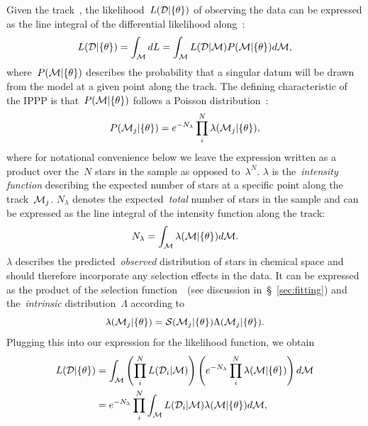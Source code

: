 \documentclass[ms.tex]{subfiles}
\begin{document}
\par
Given the track~, the likelihood~$L(\mathcal{D} | \{\theta\})$ of
observing the data can be expressed as the line integral of the differential
likelihood along~:
\begin{equation}
L(\mathcal{D} | \{\theta\}) = \int_{\mathcal{M}} dL =
\int_{\mathcal{M}} L(\mathcal{D} | \mathcal{M}) P(\mathcal{M} | \{\theta\})
d\mathcal{M},
\end{equation}
where~$P(\mathcal{M} | \{\theta\})$ describes the probability that a singular
datum will be drawn from the model at a given point along the track.
The defining characteristic of the IPPP is that~$P(\mathcal{M} | \{\theta\})$
follows a Poisson distribution~\citep{Press2007}:
\begin{equation}
P(\mathcal{M}_j | \{\theta\}) = e^{-N_\lambda}
\prod_i^N \lambda (\mathcal{M}_j | \{\theta\}),
\end{equation}
where for notational convenience below we leave the expression written as a
product over the~$N$ stars in the sample as opposed to~$\lambda^N$.
$\lambda$ is the~\textit{intensity function} describing the expected
number of stars at a specific point along the track~$\mathcal{M}_j$.
$N_\lambda$ denotes the expected~\textit{total} number of stars in the sample
and can be expressed as the line integral of the intensity function along the
track:
\begin{equation}
N_\lambda = \int_{\mathcal{M}} \lambda(\mathcal{M} | \{\theta\}) d\mathcal{M}.
\end{equation}
$\lambda$ describes the predicted~\textit{observed} distribution of stars in
chemical space and should therefore incorporate any selection effects in the
data.
It can be expressed as the product of the selection function~~(see
discussion in~\S~\ref{sec:fitting}) and the~\textit{intrinsic}
distribution~$\Lambda$ according to
\begin{equation}
\lambda(\mathcal{M}_j | \{\theta\}) = \mathcal{S}(\mathcal{M}_j | \{\theta\})
\Lambda(\mathcal{M}_j | \{\theta\}).
\end{equation}
Plugging this into our expression for the likelihood function, we obtain
\begin{subequations}\begin{align}
L(\mathcal{D} | \{\theta\}) &= \int_{\mathcal{M}}
\left(\prod_i^N L(\mathcal{D}_i | \mathcal{M})\right)
\left(e^{-N_\lambda} \prod_i^N \lambda(\mathcal{M} | \{\theta\})\right)
d\mathcal{M}
\\
&= e^{-N_\lambda} \prod_i^N \int_{\mathcal{M}} L(\mathcal{D}_i | \mathcal{M})
\lambda(\mathcal{M} | \{\theta\}) d\mathcal{M},
\end{align}\end{subequations}
\end{document}
